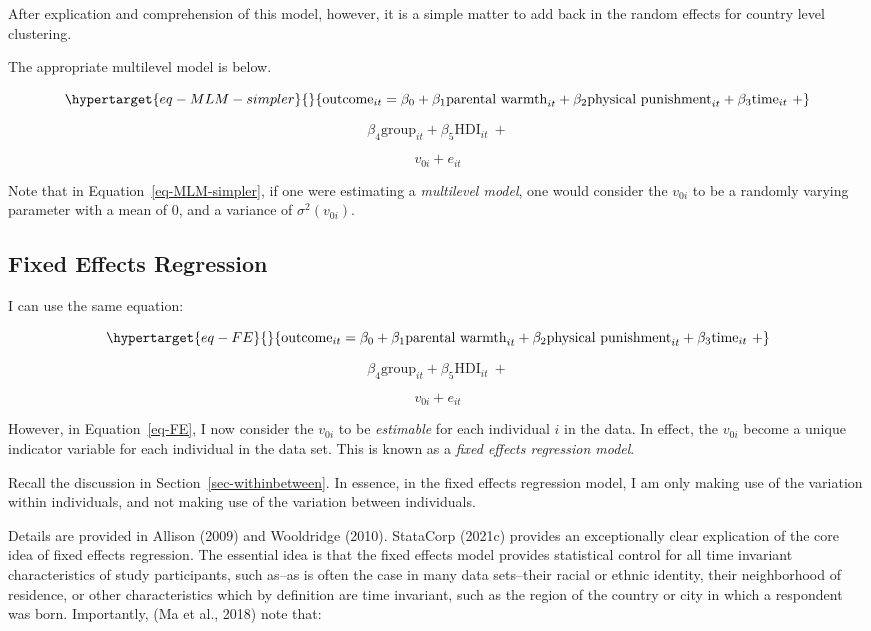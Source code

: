 \documentclass[
  letterpaper,
  DIV=11,
  numbers=noendperiod]{scrreprt}
\begin{document}
After explication and comprehension of this model, however, it is a
simple matter to add back in the random effects for country level
clustering.

The appropriate multilevel model is below.

\begin{equation}\protect\hypertarget{eq-MLM-simpler}{}{\text{outcome}_{it} = \beta_0 + \beta_1 \text{parental warmth}_{it} + \beta_2 \text{physical punishment}_{it} + \beta_3 \text{time}_{it} \ + }\label{eq-MLM-simpler}\end{equation}

\[\beta_4 \text{group}_{it} + \beta_5 \text{HDI}_{it} \ +\]

\[v_{0i} + e_{it}\]

Note that in Equation~\ref{eq-MLM-simpler}, if one were estimating a
\emph{multilevel model}, one would consider the \(v_{0i}\) to be a
randomly varying parameter with a mean of 0, and a variance of
\(\sigma^2(v_{0i})\).

\hypertarget{fixed-effects-regression}{%
\subsection{Fixed Effects Regression}\label{fixed-effects-regression}}

I can use the same equation:

\begin{equation}\protect\hypertarget{eq-FE}{}{\text{outcome}_{it} = \beta_0 + \beta_1 \text{parental warmth}_{it} + \beta_2 \text{physical punishment}_{it} + \beta_3 \text{time}_{it} \ + }\label{eq-FE}\end{equation}

\[\beta_4 \text{group}_{it} + \beta_5 \text{HDI}_{it} \ +\]

\[v_{0i} + e_{it}\]

However, in Equation~\ref{eq-FE}, I now consider the \(v_{0i}\) to be
\emph{estimable} for each individual \(i\) in the data. In effect, the
\(v_{0i}\) become a unique indicator variable for each individual in the
data set. This is known as a \emph{fixed effects regression model}.

Recall the discussion in Section~\ref{sec-withinbetween}. In essence, in
the fixed effects regression model, I am only making use of the
variation within individuals, and not making use of the variation
between individuals.

Details are provided in Allison (2009) and Wooldridge (2010). StataCorp
(2021c) provides an exceptionally clear explication of the core idea of
fixed effects regression. The essential idea is that the fixed effects
model provides statistical control for all time invariant
characteristics of study participants, such as--as is often the case in
many data sets--their racial or ethnic identity, their neighborhood of
residence, or other characteristics which by definition are time
invariant, such as the region of the country or city in which a
respondent was born. Importantly, (Ma et al., 2018) note that:
\end{document}
